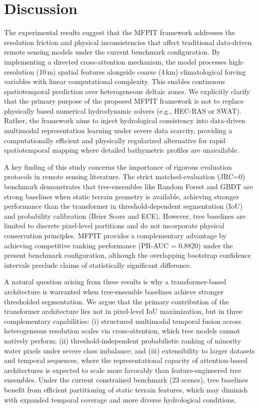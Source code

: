 \documentclass[preprint,12pt]{elsarticle}
\begin{document}
\section{Discussion}
The experimental results suggest that the MFPIT framework addresses the resolution friction and physical inconsistencies that affect traditional data-driven remote sensing models under the current benchmark configuration. By implementing a directed cross-attention mechanism, the model processes high-resolution (10\,m) spatial features alongside coarse (4\,km) climatological forcing variables with linear computational complexity. This enables continuous spatiotemporal prediction over heterogeneous deltaic zones. We explicitly clarify that the primary purpose of the proposed MFPIT framework is not to replace physically based numerical hydrodynamic solvers (e.g., HEC-RAS or SWAT). Rather, the framework aims to inject hydrological consistency into data-driven multimodal representation learning under severe data scarcity, providing a computationally efficient and physically regularized alternative for rapid spatiotemporal mapping where detailed bathymetric profiles are unavailable.

A key finding of this study concerns the importance of rigorous evaluation protocols in remote sensing literature. The strict matched-evaluation (JRC=0) benchmark demonstrates that tree-ensembles like Random Forest and GBDT are strong baselines when static terrain geometry is available, achieving stronger performance than the transformer in threshold-dependent segmentation (IoU) and probability calibration (Brier Score and ECE). However, tree baselines are limited to discrete pixel-level partitions and do not incorporate physical conservation principles. MFPIT provides a complementary advantage by achieving competitive ranking performance (PR-AUC = 0.8820) under the present benchmark configuration, although the overlapping bootstrap confidence intervals preclude claims of statistically significant difference.

A natural question arising from these results is why a transformer-based architecture is warranted when tree-ensemble baselines achieve stronger thresholded segmentation. We argue that the primary contribution of the transformer architecture lies not in pixel-level IoU maximization, but in three complementary capabilities: (i) structured multimodal temporal fusion across heterogeneous resolution scales via cross-attention, which tree models cannot natively perform; (ii) threshold-independent probabilistic ranking of minority water pixels under severe class imbalance; and (iii) extensibility to larger datasets and temporal sequences, where the representational capacity of attention-based architectures is expected to scale more favorably than feature-engineered tree ensembles. Under the current constrained benchmark (23 scenes), tree baselines benefit from efficient partitioning of static terrain features, which may diminish with expanded temporal coverage and more diverse hydrological conditions.
\end{document}
